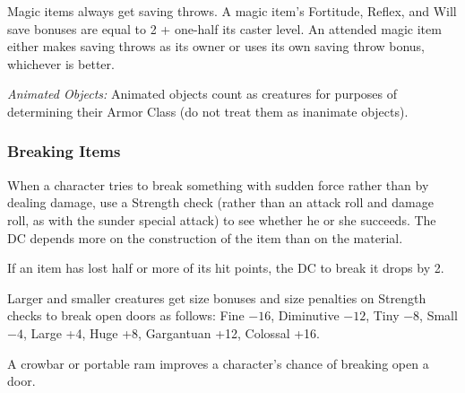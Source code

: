 Magic items always get saving throws. A magic item's Fortitude, Reflex, and Will save bonuses are equal to 2 + one-half its caster level. An attended magic item either makes saving throws as its owner or uses its own saving throw bonus, whichever is better.

\textit{Animated Objects:} Animated objects count as creatures for purposes of determining their Armor Class (do not treat them as inanimate objects).

\subsubsection{Breaking Items}
When a character tries to break something with sudden force rather than by dealing damage, use a Strength check (rather than an attack roll and damage roll, as with the sunder special attack) to see whether he or she succeeds. The DC depends more on the construction of the item than on the material.

If an item has lost half or more of its hit points, the DC to break it drops by 2.

Larger and smaller creatures get size bonuses and size penalties on Strength checks to break open doors as follows: Fine $-16$, Diminutive $-12$, Tiny $-8$, Small $-4$, Large +4, Huge +8, Gargantuan +12, Colossal +16.

A crowbar or portable ram improves a character's chance of breaking open a door.
